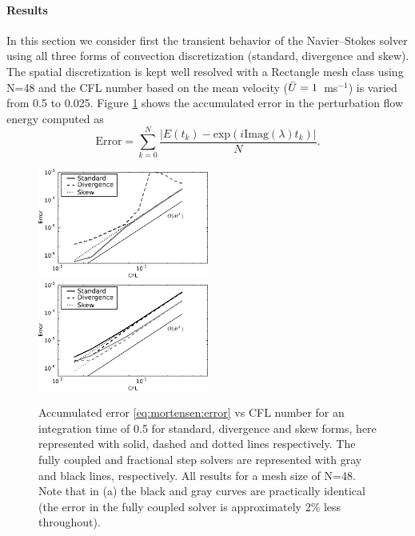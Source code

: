 \paragraph{Results}

In this section we consider first the transient behavior of the
Navier--Stokes solver using all three forms of convection discretization
(standard, divergence and skew). The spatial discretization is kept
well resolved with a Rectangle mesh class using N=48 and the CFL number
based on the mean velocity ($\Bar{U}=1$~ms$^{-1}$) is varied from 0.5
to 0.025. Figure \ref{fig:mortensen:OS_init_cfl} shows the accumulated
error in the perturbation flow energy computed as
\begin{equation}
 \text{Error} = \sum_{k=0}^N \frac{|E(t_k)-\text{exp}(i \text{Imag}(\lambda) t_k)|}{N}.
 \label{eq:mortensen:error}
\end{equation}
\begin{figure}
 \includegraphics[width=0.5\textwidth]{chapters/mortensen/pdf/OS_init_cfl_1.pdf}
 \includegraphics[width=0.5\textwidth]{chapters/mortensen/pdf/OS_init_cfl_0.pdf}
 \caption{Accumulated error \eqref{eq:mortensen:error} vs CFL number
   for an integration time of 0.5 for standard, divergence and skew
   forms, here represented with solid, dashed and dotted lines
   respectively. The fully coupled and fractional step solvers are
   represented with gray and black lines, respectively. All results
   for a mesh size of N=48. Note that in (a) the black and gray curves
   are practically identical (the error in the fully coupled solver is
   approximately 2\% less throughout). }
\label{fig:mortensen:OS_init_cfl}
\end{figure}
